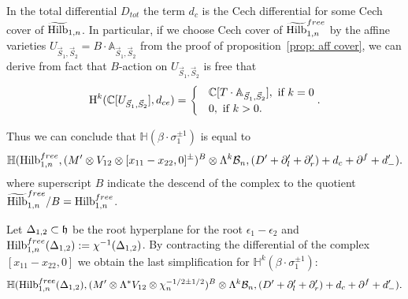 \documentclass[10pt]{amsart}
\begin{document}
In the total differential $D_{tot}$ the term $d_c$ is the Cech differential for some Cech cover
of $\widetilde{\mathrm{Hilb}}_{1,n}$.
In particular, if we choose Cech cover of $\widetilde{\mathrm{Hilb}}_{1,n}^{free}$ by the affine varieties $U_{\vec{S}_1,\vec{S}_2}=B\cdot \mathbb{A}_{\vec{S}_1,\vec{S}_2}$ from the proof of proposition~\ref{prop: aff cover}, we
can derive from fact that $B$-action on $U_{\vec{S}_1,\vec{S}_2}$ is free that
$$\textup{H}^k(\mathbb{C}[U_{\vec{S}_1,\vec{S}_2}],d_{ce})=\begin{cases} &\mathbb{C}[T\cdot \mathbb{A}_{\vec{S}_1,\vec{S}_2}],\mbox{ if } k=0\\ &0,\mbox{ if } k>0.\end{cases}.$$

Thus we can conclude that \(\mathbb{H}(\beta\cdot\sigma_{1}^{\pm 1})\) is equal to
$$ \mathbb{H}(\mathrm{Hilb}_{1,n}^{free}, (M'\otimes V_{12}\otimes [x_{11}-x_{22},0]^{\pm})^{B}\otimes \Lambda^k\mathcal{B}_n,
(D'+\partial'_l+\partial'_r)+d_c+\partial^f+d'_-).$$
where superscript $B$ indicate the descend of the complex to the quotient $\widetilde{\mathrm{Hilb}}_{1,n}^{free}/B=\mathrm{Hilb}_{1,n}^{free}$.

Let $\Delta_{1,2}\subset\mathfrak{h}$ be the root hyperplane for  the root $\epsilon_1-\epsilon_{2}$ and $\mathrm{Hilb}^{free}_{1,n}(\Delta_{1,2}):=\chi^{-1}(\Delta_{1,2})$. By contracting the differential
of the complex $[x_{11}-x_{22},0]$ we obtain the last simplification for \(\mathbb{H}^k(\beta\cdot\sigma_{1}^{\pm 1})\):
$$ \mathbb{H}(\mathrm{Hilb}_{1,n}^{free}(\Delta_{1,2}), (M'\otimes\Lambda^* V_{12}\otimes\chi_n^{-1/2\pm 1/2})^{B}\otimes \Lambda^k\mathcal{B}_n,
(D'+\partial'_l+\partial'_r)+d_c+\partial^f+d'_-).$$

\end{document}

